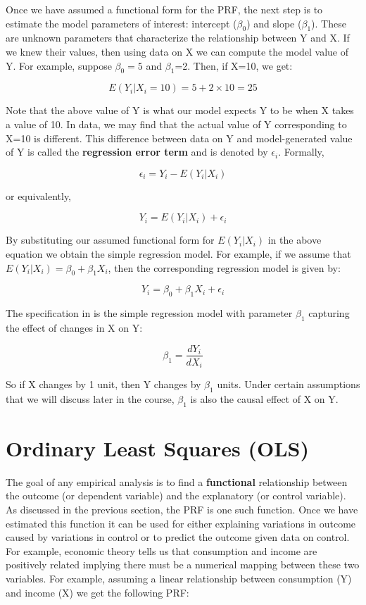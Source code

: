 \documentclass[
]{book}
\theoremstyle{definition}
\theoremstyle{definition}
\theoremstyle{definition}
\theoremstyle{definition}
\theoremstyle{remark}
\begin{document}
Once we have assumed a functional form for the PRF, the next step is to estimate the model parameters of interest: intercept (\(\beta_0\)) and slope (\(\beta_1\)). These are unknown parameters that characterize the relationship between Y and X. If we knew their values, then using data on X we can compute the model value of Y. For example, suppose \(\beta_0=5\) and \(\beta_1\)=2. Then, if X=10, we get:

\[E(Y_i|X_i=10)=5+2\times 10=25\]

Note that the above value of Y is what our model expects Y to be when X takes a value of 10. In data, we may find that the actual value of Y corresponding to X=10 is different. This difference between data on Y and model-generated value of Y is called the \textbf{regression error term} and is denoted by \(\epsilon_i\). Formally,

\[\epsilon_i= Y_i - E(Y_i|X_i)\]

or equivalently,

\[Y_i = E(Y_i|X_i) + \epsilon_i\]

By substituting our assumed functional form for \(E(Y_i|X_i)\) in the above equation we obtain the simple regression model. For example, if we assume that \(E(Y_i|X_i)=\beta_0 + \beta_1 X_i\), then the corresponding regression model is given by:

\begin{equation}
Y_i=\beta_0 + \beta_1 X_i + \epsilon_i
\label{eq:simple}
\end{equation}

The specification in \label{eq:simple} is the simple regression model with parameter \(\beta_1\) capturing the effect of changes in X on Y:

\[\beta_1= \frac{dY_i}{dX_i}\]

So if X changes by 1 unit, then Y changes by \(\beta_1\) units. Under certain assumptions that we will discuss later in the course, \(\beta_1\) is also the causal effect of X on Y.

\hypertarget{ordinary-least-squares-ols}{%
\section{Ordinary Least Squares (OLS)}\label{ordinary-least-squares-ols}}

The goal of any empirical analysis is to find a \textbf{functional} relationship between the outcome (or dependent variable) and the explanatory (or control variable). As discussed in the previous section, the PRF is one such function. Once we have estimated this function it can be used for either explaining variations in outcome caused by variations in control or to predict the outcome given data on control. For example, economic theory tells us that consumption and income are positively related implying there must be a numerical mapping between these two variables. For example, assuming a linear relationship between consumption (Y) and income (X) we get the following PRF:
\end{document}
